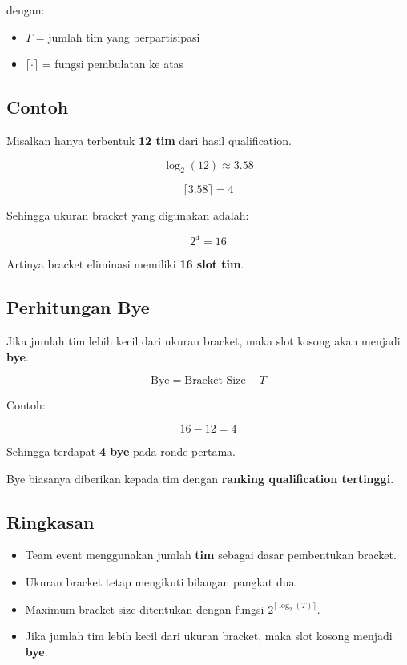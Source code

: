 dengan:

\begin{itemize}
\item $T$ = jumlah tim yang berpartisipasi
\item $\lceil \cdot \rceil$ = fungsi pembulatan ke atas
\end{itemize}

\subsection{Contoh}

Misalkan hanya terbentuk \textbf{12 tim} dari hasil qualification.

\[
\log_2(12) \approx 3.58
\]

\[
\lceil 3.58 \rceil = 4
\]

Sehingga ukuran bracket yang digunakan adalah:

\[
2^4 = 16
\]

Artinya bracket eliminasi memiliki \textbf{16 slot tim}.

\subsection{Perhitungan Bye}

Jika jumlah tim lebih kecil dari ukuran bracket, maka slot kosong akan menjadi \textbf{bye}.

\[
\text{Bye} = \text{Bracket Size} - T
\]

Contoh:

\[
16 - 12 = 4
\]

Sehingga terdapat \textbf{4 bye} pada ronde pertama.

Bye biasanya diberikan kepada tim dengan \textbf{ranking qualification tertinggi}.

\subsection{Ringkasan}

\begin{itemize}
\item Team event menggunakan jumlah \textbf{tim} sebagai dasar pembentukan bracket.
\item Ukuran bracket tetap mengikuti bilangan pangkat dua.
\item Maximum bracket size ditentukan dengan fungsi $2^{\lceil \log_2(T) \rceil}$.
\item Jika jumlah tim lebih kecil dari ukuran bracket, maka slot kosong menjadi \textbf{bye}.
\end{itemize}